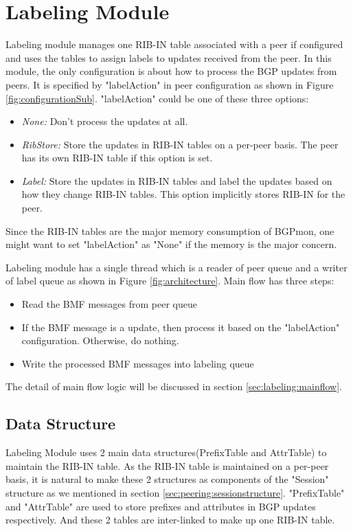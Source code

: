 \section{Labeling Module}
\label{sec:labeling}
Labeling module manages one RIB-IN table associated with a peer if configured and uses the tables to assign labels to updates received from the peer.  In this module, the only configuration is about how to process the BGP updates from peers. It is specified by "labelAction" in peer configuration as shown in Figure \ref{fig:configurationSub}. "labelAction" could be one of these three options:
\begin{itemize}
\item{ \emph{None:} Don't process the updates at all. }
\item{ \emph{RibStore:} Store the updates in RIB-IN tables on a per-peer basis. The peer has its own RIB-IN table if this option is set.}
\item{ \emph{Label:} Store the updates in RIB-IN tables and label the updates based on how they change RIB-IN tables. This option implicitly stores RIB-IN for the peer. }
\end{itemize}
Since the RIB-IN tables are the major memory consumption of BGPmon, one might want to set "labelAction" as "None" if the memory is the major concern. 

Labeling module has a single thread which is a reader of peer queue and a writer of label queue as shown in Figure \ref{fig:architecture}. Main flow has three steps:
\begin{itemize}
\item{ Read the BMF messages from peer queue }
\item{ If the BMF message is a update, then process it based on the "labelAction" configuration. Otherwise, do nothing.}
\item{ Write the processed BMF messages into labeling queue }
\end{itemize}
The detail of main flow logic will be discussed in section \ref{sec:labeling:mainflow}.

\subsection{Data Structure}
Labeling Module uses 2 main data structures(PrefixTable and AttrTable) to maintain the RIB-IN table. As the RIB-IN table is maintained on a per-peer basis, it is natural to make these 2 structures as components of the "Session" structure as we mentioned in section \ref{sec:peering:sessionstructure}.  "PrefixTable" and "AttrTable" are used to store prefixes and attributes in BGP updates respectively. And these 2 tables are inter-linked to make up one RIB-IN table.

